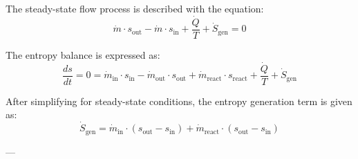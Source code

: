 The steady-state flow process is described with the equation:  
\[
\dot{m} \cdot s_{\text{out}} - \dot{m} \cdot s_{\text{in}} + \frac{\dot{Q}}{T} + \dot{S}_{\text{gen}} = 0
\]  

The entropy balance is expressed as:  
\[
\frac{ds}{dt} = 0 = \dot{m}_{\text{in}} \cdot s_{\text{in}} - \dot{m}_{\text{out}} \cdot s_{\text{out}} + \dot{m}_{\text{react}} \cdot s_{\text{react}} + \frac{\dot{Q}}{T} + \dot{S}_{\text{gen}}
\]  

After simplifying for steady-state conditions, the entropy generation term is given as:  
\[
\dot{S}_{\text{gen}} = \dot{m}_{\text{in}} \cdot (s_{\text{out}} - s_{\text{in}}) + \dot{m}_{\text{react}} \cdot (s_{\text{out}} - s_{\text{in}})
\]  

---